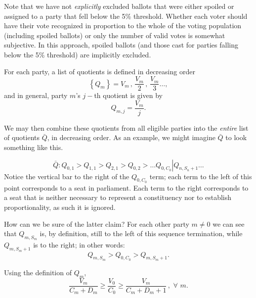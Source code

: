 \documentclass[DIV=calc, paper=a4, fontsize=11pt, twocolumn]{scrartcl}	 %
\begin{document}
Note that we have not \emph{explicitly} excluded ballots that were either spoiled or assigned to a party that fell below the 5\% threshold. Whether each voter should have their vote recognized in proportion to the whole of the voting population (including spoiled ballots) or only the number of valid votes is somewhat subjective. In this approach, spoiled ballots (and those cast for parties falling below the 5\% threshold) are implicitly excluded.


For each party, a list of quotients is defined in decreasing order
\begin{equation}
\label{eq:Qm_def}
\left\{ Q_m \right\} = V_m \, , \, \frac{V_m}{2} \, , \, \frac{V_m}{3} \ldots,
\end{equation}
and in general, party $m$'s $j-$th quotient is given by
\begin{equation}
\label{eq:Qmj_def}
Q_{m,j} = \frac{V_m}{j}.
\end{equation}

We may then combine these quotients from all eligible parties into the \emph{entire} list of quotients $\bar Q$, in decreasing order. As an example, we might imagine $\bar Q$ to look something like this.

\begin{equation}
\label{eq:Qbar_def}
\bar Q:  \left. Q_{0,1} > Q_{1,1} > Q_{2,1} >  Q_{0,2} > \ldots  Q_{0,C_0}  \right| Q_{n,S_{n}+1} \ldots 
\end{equation}
Notice the vertical bar to the right of the $Q_{0,C_0}$ term; each term to the left of this point corresponds to a seat in parliament. Each term to the right corresponds to a seat that is neither necessary to represent a constituency nor to establish proportionality, as such it is ignored.

How can we be sure of the latter claim? For each other party $m\neq 0$ we can see that $Q_{m,S_{m}}$ is, by definition, still to the left of this sequence termination, while $Q_{m,S_{m}+1}$ is to the right; in other words:
\begin{equation}
\label{eq:Qm_cutoff}
Q_{m,S_{m}}  > Q_{0,C_0} > Q_{m,S_{m}+1}. 
\end{equation}

Using the definition of $Q_m$, 
\begin{equation}
\label{eq:Sm_cutoff}
\frac{V_{m}}{C_{m}+D_m} \ge \frac{V_{0}}{C_0} \ge \frac{V_{m}}{C_{m}+D_m+1}\, , \,\, \forall \,\,  m. 
\end{equation}
\end{document}
